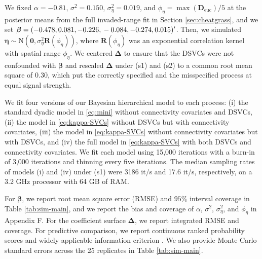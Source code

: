 \documentclass{article}
\begin{document}
We fixed $\alpha=-0.81$, $\sigma^2=0.150$, $\sigma^2_\eta=0.019$, and $\phi_\eta=\max(\mathbf{D}_{\text{euc}})/5$ at the posterior means from the full invaded-range fit in Section \ref{sec:cheatgrass}, and we set $\boldsymbol{\beta}=(-0.478, 0.081, -0.226, \\ -0.084, -0.274, 0.015)'$. 
Then, we simulated $\boldsymbol{\eta}\sim\text{N}(\boldsymbol{0},\sigma^2_\eta\mathbf{R}(\phi_\eta))$, where $\mathbf{R}(\phi_\eta)$ was an exponential correlation kernel with spatial range $\phi_\eta$. 
We centered $\boldsymbol{\Delta}$ to ensure that the DSVCs were not confounded with $\boldsymbol{\beta}$ and rescaled $\boldsymbol{\Delta}$ under (s1) and (s2) to a common root mean square of $0.30$, which put the correctly specified and the misspecified process at equal signal strength.

We fit four versions of our Bayesian hierarchical model to each process: (i) the standard dyadic model in \eqref{eq:mini} without connectivity covariates and DSVCs, (ii) the model in \eqref{eq:kappa-SVCs} without DSVCs but with connectivity covariates, (iii) the model in \eqref{eq:kappa-SVCs} without connectivity covariates but with DSVCs, and (iv) the full model in \eqref{eq:kappa-SVCs} with both DSVCs and connectivity covariates. We fit each model using 15,000 iterations with a burn-in of 3,000 iterations and thinning every five iterations. The median sampling rates of models (i) and (iv) under (s1) were 3186 it/s and 17.6 it/s, respectively, on a 3.2 GHz processor with 64 GB of RAM.

For $\boldsymbol{\beta}$, we report root mean square error (RMSE) and $95\%$ interval coverage in Table \ref{tab:sim-main}, and we report the bias and coverage of $\alpha$, $\sigma^2$, $\sigma^2_\eta$, and $\phi_\eta$ in Appendix F. For the coefficient surface $\boldsymbol{\Delta}$, we report integrated RMSE and coverage. For predictive comparison, we report continuous ranked probability scores \citep[CRPS; ][]{matheson1976scoring} and widely applicable information criterion \citep[WAIC; ][]{watanabe2010asymptotic}. We also provide Monte Carlo standard errors across the 25 replicates in Table \ref{tab:sim-main}.
\end{document}
